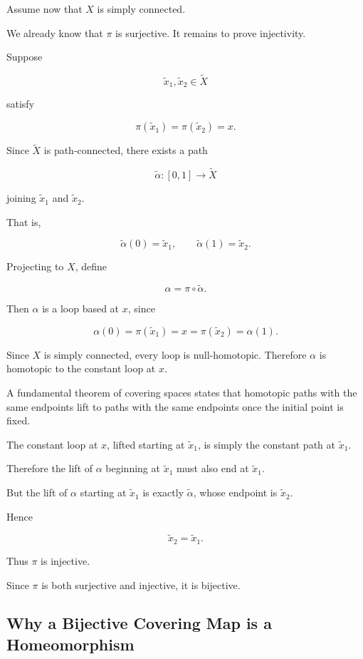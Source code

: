 \documentclass[12pt,a4paper]{article}
\theoremstyle{notespace}
\begin{document}
Assume now that \(X\) is simply connected.

We already know that \(\pi\) is surjective. It remains to prove injectivity.

Suppose

\[
\widetilde x_1,\widetilde x_2\in\widetilde X
\]

satisfy

\[
\pi(\widetilde x_1)
=
\pi(\widetilde x_2)
=
x.
\]

Since \(\widetilde X\) is path-connected, there exists a path

\[
\widetilde\alpha:[0,1]\to\widetilde X
\]

joining \(\widetilde x_1\) and \(\widetilde x_2\).

That is,

\[
\widetilde\alpha(0)=\widetilde x_1,
\qquad
\widetilde\alpha(1)=\widetilde x_2.
\]

Projecting to \(X\), define

\[
\alpha=\pi\circ\widetilde\alpha.
\]

Then \(\alpha\) is a loop based at \(x\), since

\[
\alpha(0)
=
\pi(\widetilde x_1)
=
x
=
\pi(\widetilde x_2)
=
\alpha(1).
\]

Since \(X\) is simply connected, every loop is null-homotopic. Therefore \(\alpha\) is homotopic to the constant loop at \(x\).

A fundamental theorem of covering spaces states that homotopic paths with the same endpoints lift to paths with the same endpoints once the initial point is fixed.

The constant loop at \(x\), lifted starting at \(\widetilde x_1\), is simply the constant path at \(\widetilde x_1\).

Therefore the lift of \(\alpha\) beginning at \(\widetilde x_1\) must also end at \(\widetilde x_1\).

But the lift of \(\alpha\) starting at \(\widetilde x_1\) is exactly \(\widetilde\alpha\), whose endpoint is \(\widetilde x_2\).

Hence

\[
\widetilde x_2
=
\widetilde x_1.
\]

Thus \(\pi\) is injective.

Since \(\pi\) is both surjective and injective, it is bijective.

\subsection{Why a Bijective Covering Map is a Homeomorphism}
\end{document}
